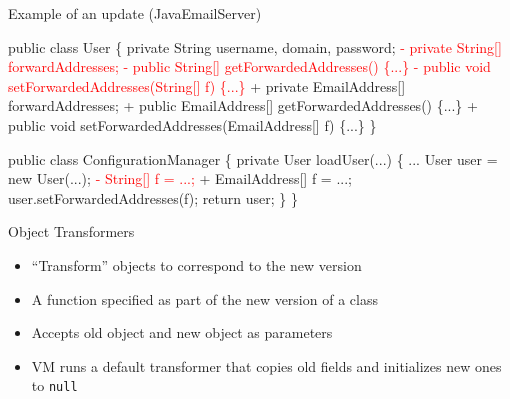 \begin{frame}[fragile,shrink=5]{Example of an update (JavaEmailServer)}%
\newcommand{\removed}[1]{\textcolor{red}{- #1}}
\newcommand{\addedxx}[1]{\textcolor{OliveGreen}{+ #1}}
\begin{\ExampleCodeSize}
\begin{semiverbatim}
  public class User \{
    private String username, domain, password;
\removed{  private String[] forwardAddresses;}
\removed{  public String[] getForwardedAddresses() \{...\}}
\removed{  public void setForwardedAddresses(String[] f) \{...\}}
\addedxx{  private EmailAddress[] forwardAddresses;}
\addedxx{  public EmailAddress[] getForwardedAddresses() \{...\}}
\addedxx{  public void setForwardedAddresses(EmailAddress[] f) \{...\}}
  \}

  public class ConfigurationManager \{
    private User loadUser(...) \{
       ...
       User user = new User(...);
\removed{     String[] f = ...;}
\addedxx{     EmailAddress[] f = ...;}
       user.setForwardedAddresses(f);
       return user;
    \}
  \}
\end{semiverbatim}
\end{\ExampleCodeSize}
\end{frame}

\begin{frame}{Object Transformers}%
\begin{itemize}
\item ``Transform'' objects to correspond to the new version
\item A function specified as part of the new version of a class
\item Accepts old object and new object as parameters
\item VM runs a default transformer that copies old fields and initializes
new ones to \texttt{null}
\end{itemize}
\end{frame}

